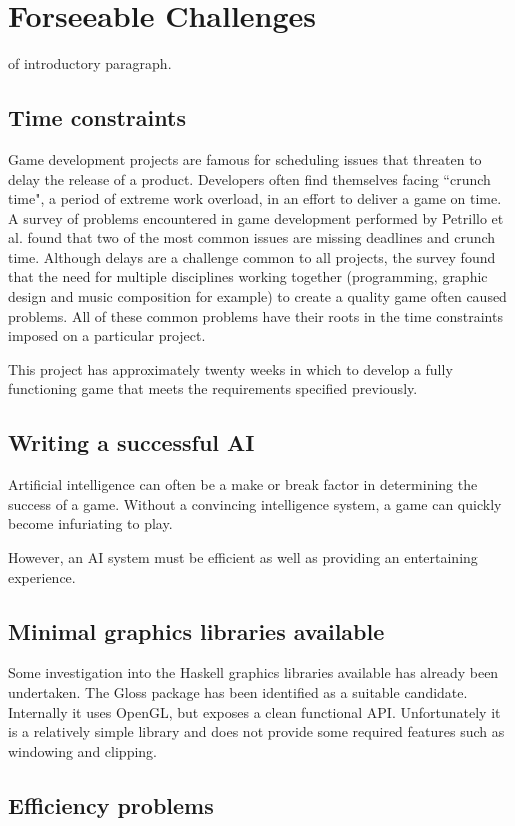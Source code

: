 \chapter[Forseeable Challenges]{Forseeable Challenges}
\label{ch:forseeable_challenges}


 of introductory paragraph.

\section{Time constraints}

Game development projects are famous for scheduling issues that threaten to delay the
release of a product. Developers often find themselves facing ``crunch time", a period
of extreme work overload, in an effort to deliver a game on time.\cite[-1em]{groen2011}
A survey of problems encountered in game development performed by Petrillo et al. found
that two of the most common issues are missing deadlines and crunch time.\cite[1em]{petrillo2009}
Although delays are a challenge common to all projects, the survey found that the need for
multiple disciplines working together (programming, graphic design and music composition for example)
to create a quality game often caused problems. All of these common problems have
their roots in the time constraints imposed on a particular project.

This project has approximately twenty weeks in which to develop a fully functioning
game that meets the requirements specified previously.

\section{Writing a successful AI}

Artificial intelligence can often be a make or break factor in determining the success of
a game. Without a convincing intelligence system, a game can
quickly become infuriating to play.

However, an AI system must be efficient as well as providing an entertaining experience.

\section{Minimal graphics libraries available}

Some investigation into the Haskell graphics libraries available has already been undertaken.
The Gloss package has been identified as a suitable candidate. Internally it
uses OpenGL, but exposes a clean functional API. Unfortunately it is a relatively simple
library and does not provide some required features such as windowing and clipping.

\section{Efficiency problems}
